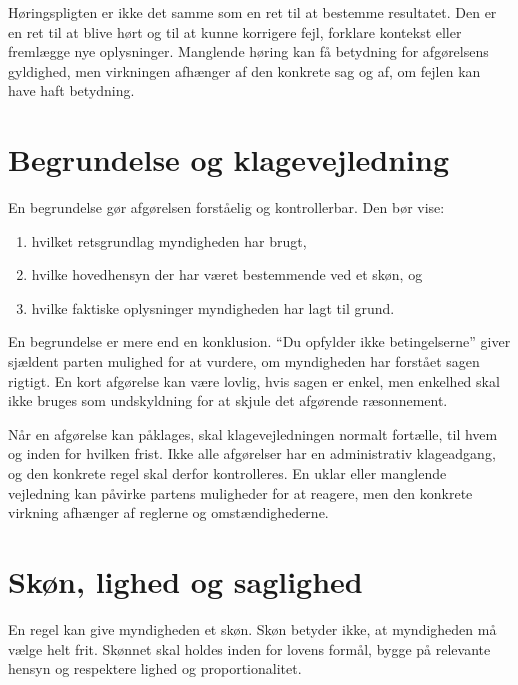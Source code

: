 Høringspligten er ikke det samme som en ret til at bestemme resultatet. Den er en ret til at blive hørt og til at kunne korrigere fejl, forklare kontekst eller fremlægge nye oplysninger. Manglende høring kan få betydning for afgørelsens gyldighed, men virkningen afhænger af den konkrete sag og af, om fejlen kan have haft betydning.

\section{Begrundelse og klagevejledning}

En begrundelse gør afgørelsen forståelig og kontrollerbar. Den bør vise:
\begin{enumerate}
  \item hvilket retsgrundlag myndigheden har brugt,
  \item hvilke hovedhensyn der har været bestemmende ved et skøn, og
  \item hvilke faktiske oplysninger myndigheden har lagt til grund.
\end{enumerate}

En begrundelse er mere end en konklusion. ``Du opfylder ikke betingelserne'' giver sjældent parten mulighed for at vurdere, om myndigheden har forstået sagen rigtigt. En kort afgørelse kan være lovlig, hvis sagen er enkel, men enkelhed skal ikke bruges som undskyldning for at skjule det afgørende ræsonnement.

Når en afgørelse kan påklages, skal klagevejledningen normalt fortælle, til hvem og inden for hvilken frist. Ikke alle afgørelser har en administrativ klageadgang, og den konkrete regel skal derfor kontrolleres. En uklar eller manglende vejledning kan påvirke partens muligheder for at reagere, men den konkrete virkning afhænger af reglerne og omstændighederne.

\section{Skøn, lighed og saglighed}

En regel kan give myndigheden et skøn. Skøn betyder ikke, at myndigheden må vælge helt frit. Skønnet skal holdes inden for lovens formål, bygge på relevante hensyn og respektere lighed og proportionalitet.

